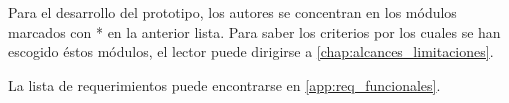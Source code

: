 Para el desarrollo del prototipo, los autores se concentran en los módulos marcados con * en la anterior lista. Para saber los criterios por los cuales se han escogido éstos módulos, el lector puede dirigirse a \ref{chap:alcances_limitaciones}.

La lista de requerimientos puede encontrarse en \ref{app:req_funcionales}.
